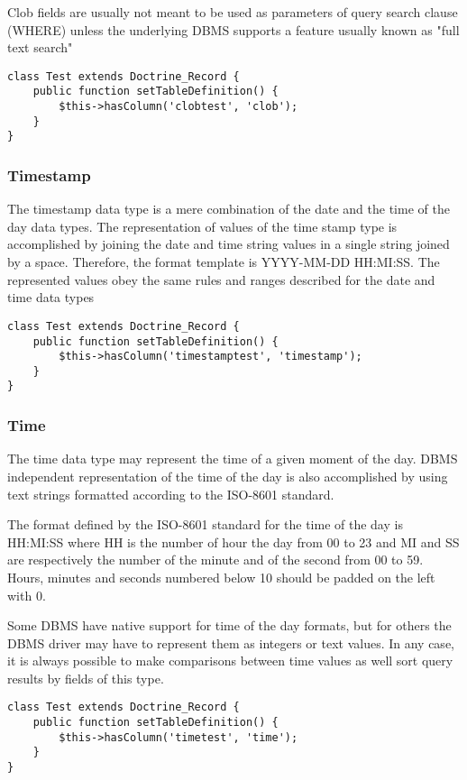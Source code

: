 \documentclass[11pt,a4paper]{report}
\begin{document}
Clob fields are usually not meant to be used as parameters of query search clause (WHERE) unless the underlying DBMS supports a feature usually known as "full text search"

\begin{verbatim}
class Test extends Doctrine_Record {
    public function setTableDefinition() {
        $this->hasColumn('clobtest', 'clob');
    }
}
\end{verbatim}

\subsubsection{Timestamp}
The timestamp data type is a mere combination of the date and the time of the day data types. The representation of values of the time stamp type is accomplished by joining the date and time string values in a single string joined by a space. Therefore, the format template is YYYY-MM-DD HH:MI:SS. The represented values obey the same rules and ranges described for the date and time data types

\begin{verbatim}
class Test extends Doctrine_Record {
    public function setTableDefinition() {
        $this->hasColumn('timestamptest', 'timestamp');
    }
}
\end{verbatim}

\subsubsection{Time}
The time data type may represent the time of a given moment of the day. DBMS independent representation of the time of the day is also accomplished by using text strings formatted according to the ISO-8601 standard.

The format defined by the ISO-8601 standard for the time of the day is HH:MI:SS where HH is the number of hour the day from 00 to 23 and MI and SS are respectively the number of the minute and of the second from 00 to 59. Hours, minutes and seconds numbered below 10 should be padded on the left with 0.

Some DBMS have native support for time of the day formats, but for others the DBMS driver may have to represent them as integers or text values. In any case, it is always possible to make comparisons between time values as well sort query results by fields of this type.

\begin{verbatim}
class Test extends Doctrine_Record {
    public function setTableDefinition() {
        $this->hasColumn('timetest', 'time');
    }
}
\end{verbatim}
\end{document}
